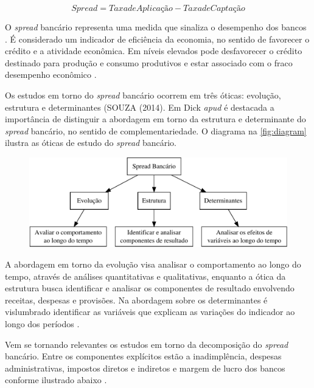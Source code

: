 \documentclass[12pt,openright,oneside,a4paper,chapter=TITLE,section=TITLE,subsection=Title,english,french,spanish,portugues,sumario=tradicional]{04-class-files/abntex2}
\begin{document}
\[
Spread = Taxa de Aplicação - Taxa de Captação
\]

O \emph{spread} bancário representa uma medida que sinaliza o desempenho dos bancos
\cite{levine:1997}. É considerado um indicador de eficiência da economia, no
sentido de favorecer o crédito e a atividade econômica. Em níveis elevados pode
desfavorecer o crédito destinado para produção e consumo produtivos e estar
associado com o fraco desempenho econômico \cite{WB:2005}.

Os estudos em torno do \emph{spread} bancário ocorrem em três óticas: evolução,
estrutura e determinantes (SOUZA (2014). Em Dick \emph{apud} \cite{leal:2006} é
destacada a importância de distinguir a abordagem em torno da estrutura e
determinante do \emph{spread} bancário, no sentido de complementariedade. O diagrama
na \autoref{fig:diagram} ilustra as óticas de estudo do \emph{spread} bancário.

\begin{figure}

\begin{center}\includegraphics{12-exportedfigures/diagram.spread-1} \end{center}
\label{fig:diagram}
\end{figure}

A abordagem em torno da evolução visa analisar o comportamento ao longo do
tempo, através de análises quantitativas e qualitativas, enquanto a ótica da
estrutura busca identificar e analisar os componentes de resultado envolvendo
receitas, despesas e provisões. Na abordagem sobre os determinantes é
vislumbrado identificar as variáveis que explicam as variações do indicador ao
longo dos períodos \cite{leal:2006}.

Vem se tornando relevantes os estudos em torno da decomposição do \emph{spread}
bancário. Entre os componentes explícitos estão a inadimplência, despesas
administrativas, impostos diretos e indiretos e margem de lucro dos bancos
conforme ilustrado abaixo \cite{BCB:2000}.
\end{document}
